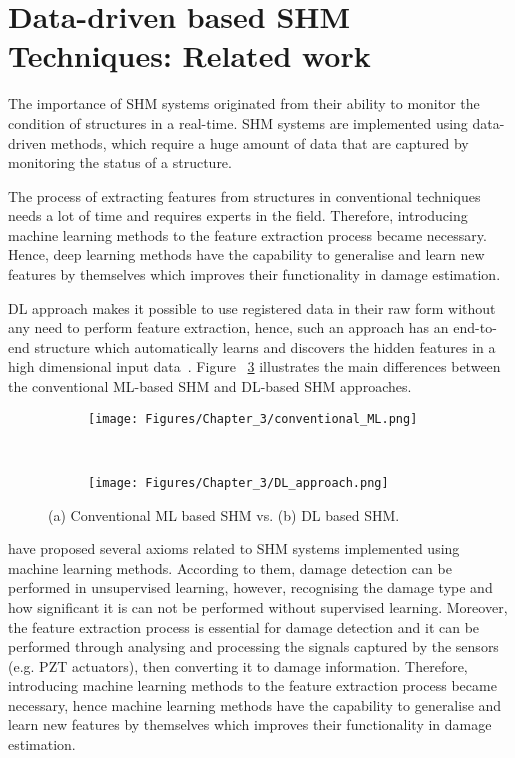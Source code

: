 \section{Data-driven based SHM Techniques: Related work}
\label{sec33}
The importance of SHM systems originated from their ability to monitor the condition of structures in a real-time.
SHM systems are implemented using data-driven methods, which require a huge amount of data that are captured by monitoring the status of a structure.

The process of extracting features from structures in conventional techniques needs a lot of time and requires experts in the field. 
Therefore, introducing machine learning methods to the feature extraction process became necessary.
Hence, deep learning methods have the capability to generalise and learn new features by themselves which improves their functionality in damage estimation.

DL approach makes it possible to use registered data in their raw form without any need to perform feature extraction, hence, such an approach has an end-to-end structure which automatically learns and discovers the hidden features in a high dimensional input data~\cite{LeCun, Networks}. 
Figure ~\ref{fig:ML_vs_DL} illustrates the main differences between the conventional ML-based SHM and DL-based SHM approaches.

\begin{figure}[!ht]
	\centering
	\begin{subfigure}{1\textwidth}		
		\centering
		\texttt{[image: Figures/Chapter\_3/conventional\_ML.png]}
		\caption{} 
		\label{fig:ML_conventional}
	\end{subfigure}
	\\
	\begin{subfigure}{1\textwidth}
		\centering
		\texttt{[image: Figures/Chapter\_3/DL\_approach.png]}
		\caption{} 
		\label{fig:DL_approach}
	\end{subfigure}	
	\caption{(a) Conventional ML based SHM vs. (b) DL based SHM.}
	\label{fig:ML_vs_DL}
\end{figure}
\textcite{Worden2007} have proposed several axioms related to SHM systems implemented using machine learning methods. 
According to them, damage detection can be performed in unsupervised learning, however, recognising the damage type and how significant it is can not be performed without supervised learning. 
Moreover, the feature extraction process is essential for damage detection and it can be performed through analysing and processing the signals captured by the sensors (e.g. PZT actuators), then converting it to damage information.
Therefore, introducing machine learning methods to the feature extraction process became necessary, hence machine learning methods have the capability to generalise and learn new features by themselves which improves their functionality in damage estimation.

